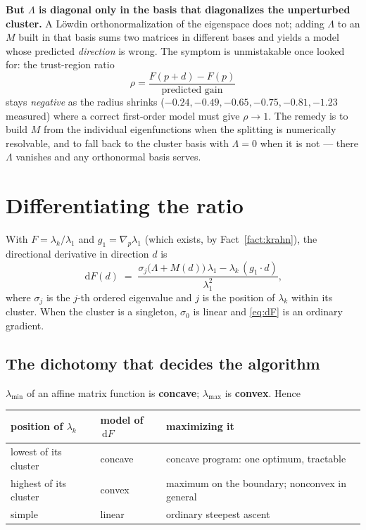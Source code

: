 \documentclass[11pt]{article}
\newcommand{\dd}{\,\mathrm{d}}
\newcommand{\lammin}{\lambda_{\min}}
\newcommand{\lammax}{\lambda_{\max}}
\theoremstyle{definition}
\begin{document}
\medskip
\noindent\textbf{But $\Lambda$ is diagonal only in the basis that diagonalizes the unperturbed
cluster.} A L\"owdin orthonormalization of the eigenspace does not; adding $\Lambda$ to an $M$
built in that basis sums two matrices in different bases and yields a model whose predicted
\emph{direction} is wrong. The symptom is unmistakable once looked for: the trust-region ratio
\[
  \rho=\frac{F(p+d)-F(p)}{\text{predicted gain}}
\]
stays \emph{negative} as the radius shrinks ($-0.24,-0.49,-0.65,-0.75,-0.81,-1.23$ measured)
where a correct first-order model must give $\rho\to1$. The remedy is to build $M$ from the
individual eigenfunctions when the splitting is numerically resolvable, and to fall back to the
cluster basis with $\Lambda=0$ when it is not --- there $\Lambda$ vanishes and any orthonormal
basis serves.

\section{Differentiating the ratio}

With $F=\lambda_k/\lambda_1$ and $g_1=\nabla_p\lambda_1$ (which exists, by
Fact~\ref{fact:krahn}), the directional derivative in direction $d$ is
\begin{equation}\label{eq:dF}
  \dd F(d)\;=\;\frac{\sigma_j\big(\Lambda+M(d)\big)\,\lambda_1-\lambda_k\,(g_1\!\cdot\!d)}
                    {\lambda_1^{2}},
\end{equation}
where $\sigma_j$ is the $j$-th ordered eigenvalue and $j$ is the position of $\lambda_k$ within
its cluster. When the cluster is a singleton, $\sigma_0$ is linear and \eqref{eq:dF} is an
ordinary gradient.

\subsection{The dichotomy that decides the algorithm}

$\lammin$ of an affine matrix function is \textbf{concave}; $\lammax$ is \textbf{convex}. Hence
\begin{center}
\begin{tabularx}{\textwidth}{@{}lLL@{}}
\toprule
position of $\lambda_k$ & model of $\dd F$ & maximizing it \\
\midrule
lowest of its cluster & concave & concave program: one optimum, tractable \\
highest of its cluster & convex & maximum on the boundary; nonconvex in general \\
simple & linear & ordinary steepest ascent \\
\bottomrule
\end{tabularx}
\end{center}
\end{document}
